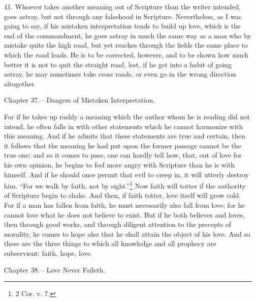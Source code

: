 41. Whoever takes another meaning out of Scripture than the writer intended, goes astray, but not through any falsehood in Scripture. Nevertheless, as I was going to say, if his mistaken interpretation tends to build up love, which is the end of the commandment, he goes astray in much the same way as a man who by mistake quits the high road, but yet reaches through the fields the same place to which the road leads. He is to be corrected, however, and to be shown how much better it is not to quit the straight road, lest, if he get into a habit of going astray, he may sometimes take cross roads, or even go in the wrong direction altogether.


Chapter 37.—Dangers of Mistaken Interpretation.

For if he takes up rashly a meaning which the author whom he is reading did not intend, he often falls in with other statements which he cannot harmonize with this meaning. And if he admits that these statements are true and certain, then it follows that the meaning he had put upon the former passage cannot be the true one: and so it comes to pass, one can hardly tell how, that, out of love for his own opinion, he begins to feel more angry with Scripture than he is with himself. And if he should once permit that evil to creep in, it will utterly destroy him. “For we walk by faith, not by sight.”\footnote{2 Cor. v. 7.} Now faith will totter if the authority of Scripture begin to shake. And then, if faith totter, love itself will grow cold. For if a man has fallen from faith, he must necessarily also fall from love; for he cannot love what he does not believe to exist. But if he both believes and loves, then through good works, and through diligent attention to the precepts of morality, he comes to hope also that he shall attain the object of his love. And so these are the three things to which all knowledge and all prophecy are subservient: faith, hope, love.


Chapter 38.—Love Never Faileth.


